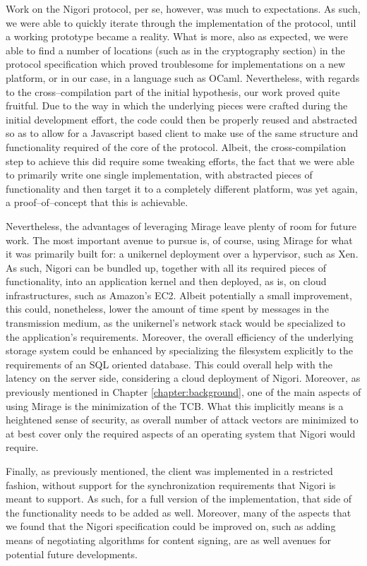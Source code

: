 Work on the Nigori protocol, per se, however, was much to expectations.
As such, we were able to quickly iterate through the implementation of the protocol, until a working prototype became a reality.
What is more, also as expected, we were able to find a number of locations (such as in the cryptography section) in the protocol specification which proved troublesome for implementations on a new platform, or in our case, in a language such as OCaml.
Nevertheless, with regards to the cross--compilation part of the initial hypothesis, our work proved quite fruitful.
Due to the way in which the underlying pieces were crafted during the initial development effort, the code could then be properly reused and abstracted so as to allow for a Javascript based client to make use of the same structure and functionality required of the core of the protocol.
Albeit, the cross-compilation step to achieve this did require some tweaking efforts, the fact that we were able to primarily write one single implementation, with abstracted pieces of functionality and then target it to a completely different platform, was yet again, a proof--of--concept that this is achievable.

Nevertheless, the advantages of leveraging Mirage leave plenty of room for future work.
The most important avenue to pursue is, of course, using Mirage for what it was primarily built for: a unikernel deployment over a hypervisor, such as Xen.
As such, Nigori can be bundled up, together with all its required pieces of functionality, into an application kernel and then deployed, as is, on cloud infrastructures, such as Amazon's EC2.
Albeit potentially a small improvement, this could, nonetheless, lower the amount of time spent by messages in the transmission medium, as the unikernel's network stack would be specialized to the application's requirements.
Moreover, the overall efficiency of the underlying storage system could be enhanced by specializing the filesystem explicitly to the requirements of an SQL oriented database.
This could overall help with the latency on the server side, considering a cloud deployment of Nigori.
Moreover, as previously mentioned in Chapter \ref{chapter:background}, one of the main aspects of using Mirage is the minimization of the TCB.
What this implicitly means is a heightened sense of security, as overall number of attack vectors are minimized to at best cover only the required aspects of an operating system that Nigori would require.

Finally, as previously mentioned, the client was implemented in a restricted fashion, without support for the synchronization requirements that Nigori is meant to support.
As such, for a full version of the implementation, that side of the functionality needs to be added as well.
Moreover, many of the aspects that we found that the Nigori specification could be improved on, such as adding means of negotiating algorithms for content signing, are as well avenues for potential future developments.

